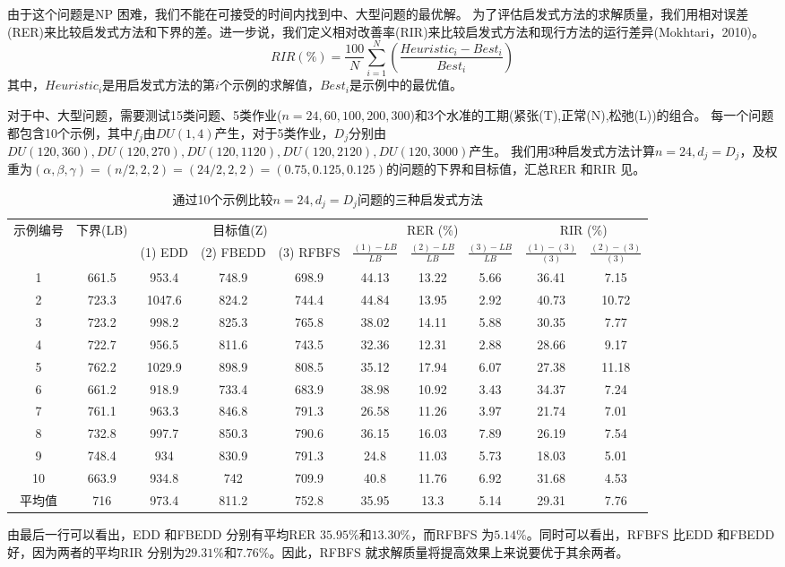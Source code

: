 由于这个问题是NP 困难，我们不能在可接受的时间内找到中、大型问题的最优解。
为了评估启发式方法的求解质量，我们用相对误差(RER)来比较启发式方法和下界的差。进一步说，我们定义相对改善率(RIR)来比较启发式方法和现行方法的运行差异(Mokhtari，2010)。
\[RIR(\%) = \frac{100}{N}\sum_{i=1}^N \left(\frac{Heuristic_i - Best_i}{Best_i}\right)
\]
其中，$Heuristic_i$是用启发式方法的第$i$个示例的求解值，$Best_i$是示例中的最优值。

对于中、大型问题，需要测试15类问题、5类作业($n = 24,60,100,200,300$)和3个水准的工期(紧张(T),正常(N),松弛(L))的组合。
每一个问题都包含10个示例，其中$f_j$由$DU(1,4)$产生，对于5类作业，$D_j$分别由$DU(120,360),DU(120,270),DU(120,1120),DU(120,2120),DU(120,3000)$产生。
我们用3种启发式方法计算$n=24,d_j=D_j$，及权重为$(\alpha,\beta,\gamma)=(n/2,2,2)=(24/2,2,2)=(0.75,0.125,0.125)$的问题的下界和目标值，汇总RER 和RIR 见。
\begin{table}[h]
  \centering\xiaowu
  \caption{通过10个示例比较$n=24, d_j = D_j$问题的三种启发式方法}
    \begin{tabular}{cccccccccc}
    \toprule
    \multirow{2}[4]{*}{示例编号} & 下界(LB)    & \multicolumn{3}{c}{目标值(Z)} & \multicolumn{3}{c}{RER (\%)} & \multicolumn{2}{c}{RIR (\%)} \\
    \cline{2-10}
          &       & (1) EDD & (2) FBEDD & (3) RFBFS &$\frac{(1) - LB}{LB}$ & $\frac{(2) - LB}{LB}$ & $\frac{(3) - LB}{LB}$ &$\frac{(1) - (3)}{(3)}$ & $\frac{(2) - (3)}{(3)}$ \\
          \midrule 
    1     & 661.5 & 953.4 & 748.9 & 698.9 & 44.13 & 13.22 & 5.66  & 36.41 & 7.15 \\
    2     & 723.3 & 1047.6 & 824.2 & 744.4 & 44.84 & 13.95 & 2.92  & 40.73 & 10.72 \\
    3     & 723.2 & 998.2 & 825.3 & 765.8 & 38.02 & 14.11 & 5.88  & 30.35 & 7.77 \\
    4     & 722.7 & 956.5 & 811.6 & 743.5 & 32.36 & 12.31 & 2.88  & 28.66 & 9.17 \\
    5     & 762.2 & 1029.9 & 898.9 & 808.5 & 35.12 & 17.94 & 6.07  & 27.38 & 11.18 \\
    6     & 661.2 & 918.9 & 733.4 & 683.9 & 38.98 & 10.92 & 3.43  & 34.37 & 7.24 \\
    7     & 761.1 & 963.3 & 846.8 & 791.3 & 26.58 & 11.26 & 3.97  & 21.74 & 7.01 \\
    8     & 732.8 & 997.7 & 850.3 & 790.6 & 36.15 & 16.03 & 7.89  & 26.19 & 7.54 \\
    9     & 748.4 & 934   & 830.9 & 791.3 & 24.8  & 11.03 & 5.73  & 18.03 & 5.01 \\
    10    & 663.9 & 934.8 & 742   & 709.9 & 40.8  & 11.76 & 6.92  & 31.68 & 4.53 \\[3pt]
    平均值   & 716   & 973.4 & 811.2 & 752.8 & 35.95 & 13.3  & 5.14  & 29.31 & 7.76 \\
    \bottomrule
    \end{tabular}
  \label{tab:comparen=24}
\end{table}
由最后一行可以看出，EDD 和FBEDD 分别有平均RER $35.95\%\text{和}13.30\%$，而RFBFS 为$5.14\%$。同时可以看出，RFBFS 比EDD 和FBEDD 好，因为两者的平均RIR 分别为$29.31\%\text{和}7.76\%$。因此，RFBFS 就求解质量将提高效果上来说要优于其余两者。


